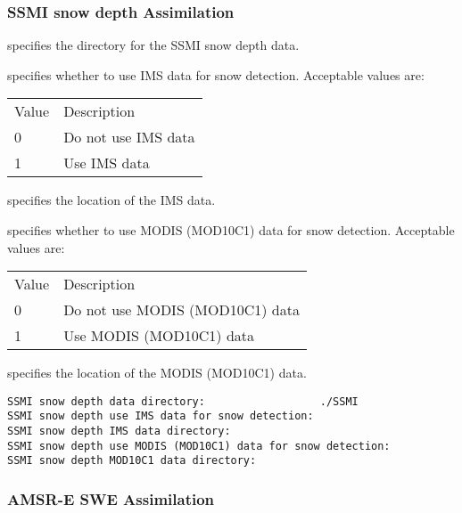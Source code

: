  
 
 \subsubsection{SSMI snow depth Assimilation}
 \label{sssec:ssmisnowdepthda}
 

 
  specifies the directory for the
 SSMI snow depth data.

  specifies
 whether to use IMS data for snow detection.
 Acceptable values are:

 \begin{tabular}{ll}
 Value & Description                  \\
  0    & Do not use IMS data          \\
  1    & Use IMS data                 \\
 \end{tabular}

  specifies the location of
 the IMS data.

 specifies whether to use MODIS (MOD10C1) data for snow detection.
 Acceptable values are: 

 \begin{tabular}{ll}
 Value & Description                      \\
  0    & Do not use MODIS (MOD10C1) data  \\
  1    & Use MODIS (MOD10C1) data         \\
 \end{tabular}

  specifies the location
 of the MODIS (MOD10C1) data.
 

 \begin{Verbatim}[frame=single]
SSMI snow depth data directory:                  ./SSMI
SSMI snow depth use IMS data for snow detection:
SSMI snow depth IMS data directory:
SSMI snow depth use MODIS (MOD10C1) data for snow detection:
SSMI snow depth MOD10C1 data directory:
 \end{Verbatim}
 

 
 
 \subsubsection{AMSR-E SWE Assimilation}
 \label{sssec:amsresweda}
 

